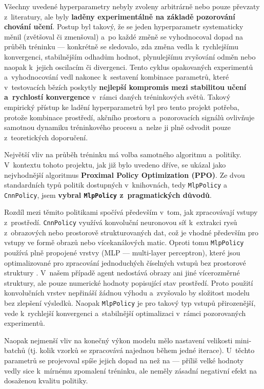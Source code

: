 Všechny uvedené hyperparametry nebyly zvoleny arbitrárně nebo pouze převzaty z~literatury, ale byly \textbf{laděny experimentálně na základě pozorování chování učení}. Postup byl takový, že se jeden hyperparametr systematicky měnil (zvětšoval či zmenšoval) a~po každé změně se vyhodnocoval dopad na průběh tréninku — konkrétně se sledovalo, zda změna vedla k~rychlejšímu konvergenci, stabilnějším odhadům hodnot, plynulejšímu zvyšování odměn nebo naopak k~jejich oscilacím či divergenci. Tento cyklus opakovaných experimentů a~vyhodnocování vedl nakonec k~sestavení kombinace parametrů, které v~testovacích bězích poskytly \textbf{nejlepší kompromis mezi stabilitou učení a~rychlostí konvergence} v~rámci daných tréninkových světů. Takový empirický přístup ke ladění hyperparametrů byl pro tento projekt potřeba, protože kombinace prostředí, akčního prostoru a~pozorovacích signálů ovlivňuje samotnou dynamiku tréninkového procesu a~nelze ji plně odvodit pouze z~teoretických doporučení.

Největší vliv na průběh tréninku má volba samotného algoritmu a~politiky. V~kontextu tohoto projektu, jak již bylo uvedeno dříve, se ukázal jako nejvhodnější algoritmus \textbf{Proximal Policy Optimization (PPO)}. Ze dvou standardních typů politik dostupných v~knihovnách, tedy \texttt{MlpPolicy} a \texttt{CnnPolicy}, jsem \textbf{vybral \texttt{MlpPolicy} z~pragmatických důvodů}.

Rozdíl mezi těmito politikami spočívá především v~tom, jak zpracovávají vstupy z~prostředí. \texttt{CnnPolicy} využívá konvoluční neuronovou síť k~extrakci rysů z~obrazových nebo prostorově strukturovaných dat, což je vhodné především pro vstupy ve formě obrazů nebo vícekanálových matic. Oproti tomu \texttt{MlpPolicy} používá plně propojené vrstvy (MLP — multi-layer perceptron), které jsou optimalizované pro zpracování jednoduchých číselných vstupů bez prostorové struktury \cite{turn0search0}. V~našem případě agent nedostává obrazy ani jiné vícerozměrné struktury, ale pouze numerické hodnoty popisující stav prostředí. Proto použití konvolučních vrstev nepřináší žádnou výhodu a~zvyšovalo by složitost modelu bez zlepšení výsledků. Naopak \texttt{MlpPolicy} je pro takový typ vstupů přirozenější, vede k~rychlejší konvergenci a~stabilnější optimalizaci v~rámci pozorovaných experimentů.

Naopak nejmenší vliv na konečný výkon modelu mělo nastavení velikosti mini-batchů (tj. kolik vzorků se zpracovává najednou během jedné iterace). U~těchto parametrů se projevoval spíše jejich dopad na  než na  — příliš velké hodnoty vedly sice k~mírnému zpomalení tréninku, ale neměly zásadní negativní efekt na dosaženou kvalitu politiky.

